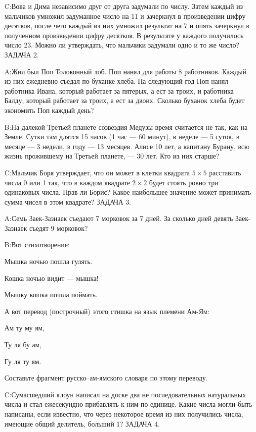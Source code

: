 \documentclass[10pt]{scrbook} \usepackage{modules/nonstahp_book}
\begin{document}
C:\qquad Вова и Дима независимо друг от друга задумали по числу. Затем каждый из мальчиков умножил задуманное число на 11 и зачеркнул в произведении цифру десятков, после чего каждый из них умножил результат на 7 и опять зачеркнул в полученном произведении цифру десятков. В результате у каждого получилось число 23. Можно ли утверждать, что мальчики задумали одно и то же число?
\medbreak
\noindent
ЗАДАЧА 2.

A:\qquad Жил был Поп Толоконный лоб. Поп нанял для работы 8 работников. Каждый из них ежедневно съедал по буханке хлеба. На следующий год Поп нанял работника Ивана, который работает за пятерых, а ест за троих, и работника Балду, который работает за троих, а ест за двоих. Сколько буханок хлеба будет экономить Поп каждый день?

B:\qquad На далекой Третьей планете созвездия Медузы время  считается не так, как на Земле. Сутки там длятся 15 часов (1 час — 60 минут), в неделе — 5 суток, в месяце — 3 недели, в году — 13 месяцев. Алисе 10 лет, а капитану  Бурану, всю жизнь прожившему  на Третьей планете, — 30 лет. Кто из них старше?

C:\qquad Мальчик Боря утверждает, что он может в клетки квадрата $5\times 5$ расставить числа 0 или 1 так, что в каждом квадрате $2\times 2$ будет стоять ровно три одинаковых числа. Прав ли Борис? Какое наибольшее значение может принимать сумма чисел в этом квадрате?
\medbreak
\noindent
ЗАДАЧА 3.

A:\qquad Семь Заек-Зазнаек съедают 7 морковок за 7 дней. За сколько дней девять  Заек-Зазнаек съедят 9 морковок?

B:\qquad Вот стихотворение:

Мышка ночью пошла гулять.

Кошка ночью видит --- мышка!

Мышку кошка пошла поймать.

А вот перевод (построчный) этого стишка на язык племени Ам-Ям:

Ам ту му ям,

Ту ля бу ам,

Гу ля ту ям.

Составьте фрагмент русско--ам-ямского словаря по этому переводу.

C:\qquad Сумасшедший клоун написал на доске два не последовательных натуральных числа и стал ежесекундно прибавлять к ним по единице. Какие числа могли быть написаны, если известно, что через некоторое время из них получились числа, имеющие общий делитель, больший 1?
\medbreak
\noindent
ЗАДАЧА 4. 
\end{document}
